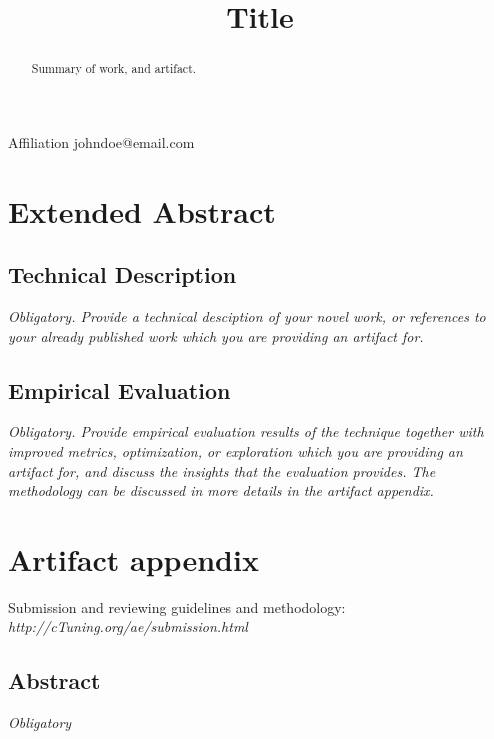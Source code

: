 \documentclass{sigplanconf}
\begin{document}

\title{Title}

{Affiliation}
{johndoe@email.com}

\maketitle

\begin{abstract}
Summary of work, and artifact.
\end{abstract}

\section{Extended Abstract}

\subsection{Technical Description}
{\em Obligatory. Provide a technical desciption of your novel work, or references to
your already published work which you are providing an artifact for.}

\subsection{Empirical Evaluation}
{\em Obligatory. Provide empirical evaluation results of the technique together with improved metrics, 
optimization, or exploration which you are providing an artifact for, and discuss the insights 
that the evaluation provides. The methodology can be discussed in more details in the artifact appendix.}

\newpage

\appendix
\section{Artifact appendix}

Submission and reviewing guidelines and methodology: \\
{\em http://cTuning.org/ae/submission.html}

\subsection{Abstract}

{\em Obligatory}
\end{document}
